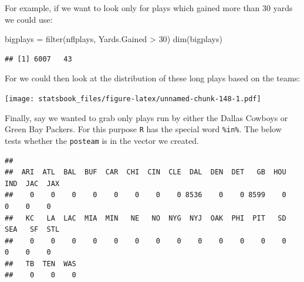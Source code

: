 \documentclass[
]{book}
\newenvironment{Shaded}{\begin{snugshade}}{\end{snugshade}}
\newcommand{\AttributeTok}[1]{\textcolor[rgb]{0.77,0.63,0.00}{#1}}
\newcommand{\DecValTok}[1]{\textcolor[rgb]{0.00,0.00,0.81}{#1}}
\newcommand{\FunctionTok}[1]{\textcolor[rgb]{0.00,0.00,0.00}{#1}}
\newcommand{\NormalTok}[1]{#1}
\newcommand{\OtherTok}[1]{\textcolor[rgb]{0.56,0.35,0.01}{#1}}
\newcommand{\SpecialCharTok}[1]{\textcolor[rgb]{0.00,0.00,0.00}{#1}}
\newcommand{\StringTok}[1]{\textcolor[rgb]{0.31,0.60,0.02}{#1}}
\theoremstyle{definition}
\theoremstyle{definition}
\theoremstyle{definition}
\theoremstyle{definition}
\theoremstyle{remark}
\begin{document}
For example, if we want to look only for plays which gained more than 30 yards we could use:

\begin{Shaded}
\begin{Highlighting}[]
\NormalTok{bigplays }\OtherTok{=} \FunctionTok{filter}\NormalTok{(nflplays, Yards.Gained }\SpecialCharTok{\textgreater{}} \DecValTok{30}\NormalTok{)}
\FunctionTok{dim}\NormalTok{(bigplays)}
\end{Highlighting}
\end{Shaded}

\begin{verbatim}
## [1] 6007   43
\end{verbatim}

For we could then look at the distribution of these long plays based on the teams:

\begin{Shaded}
\end{Shaded}

\texttt{[image: statsbook\_files/figure-latex/unnamed-chunk-148-1.pdf]}

Finally, say we wanted to grab only plays run by either the Dallas Cowboys or Green Bay Packers. For this purpose \texttt{R} has the special word \texttt{\%in\%}. The below tests whether the \texttt{posteam} is in the vector we created.

\begin{Shaded}
\end{Shaded}

\begin{verbatim}
## 
##  ARI  ATL  BAL  BUF  CAR  CHI  CIN  CLE  DAL  DEN  DET   GB  HOU  IND  JAC  JAX 
##    0    0    0    0    0    0    0    0 8536    0    0 8599    0    0    0    0 
##   KC   LA  LAC  MIA  MIN   NE   NO  NYG  NYJ  OAK  PHI  PIT   SD  SEA   SF  STL 
##    0    0    0    0    0    0    0    0    0    0    0    0    0    0    0    0 
##   TB  TEN  WAS 
##    0    0    0
\end{verbatim}
\end{document}
